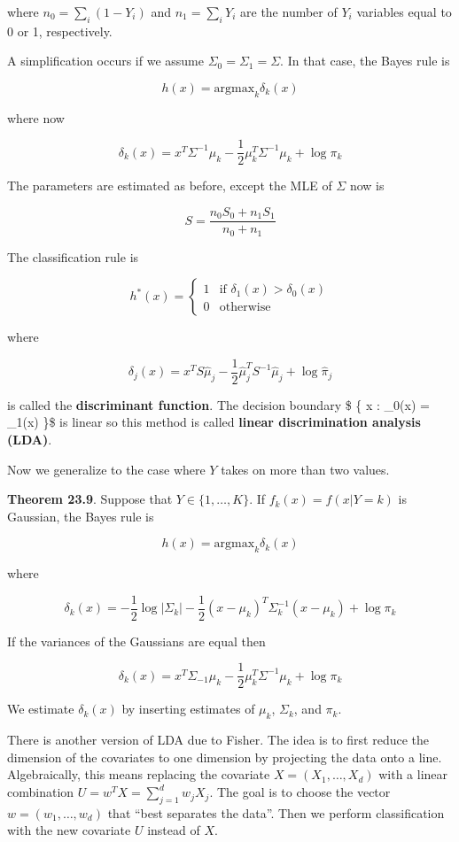 where \(n_0 = \sum_i (1 - Y_i)\) and \(n_1 = \sum_i Y_i\) are the number
of \(Y_i\) variables equal to 0 or 1, respectively.

A simplification occurs if we assume \(\Sigma_0 = \Sigma_1 = \Sigma\).
In that case, the Bayes rule is

\[ h(x) = \text{argmax}_k \delta_k(x) \]

where now

\[ \delta_k(x) = x^T \Sigma^{-1} \mu_k - \frac{1}{2} \mu_k^T \Sigma^{-1} \mu_k + \log \pi_k \]

The parameters are estimated as before, except the MLE of \(\Sigma\) now
is

\[ S = \frac{n_0 S_0 + n_1 S_1}{n_0 + n_1} \]

The classification rule is

\[
h^*(x) = \begin{cases}
1 &\text{if } \delta_1(x) > \delta_0(x) \\
0 &\text{otherwise}
\end{cases}
\]

where

\[ \delta_j(x) = x^T S \hat{\mu}_j - \frac{1}{2} \hat{\mu}_j^T S^{-1} \hat{\mu}_j + \log \hat{\pi}_j \]

is called the \textbf{discriminant function}. The decision boundary \$
\{ x : \delta\_0(x) = \delta\_1(x) \}\$ is linear so this method is
called \textbf{linear discrimination analysis (LDA)}.

Now we generalize to the case where \(Y\) takes on more than two values.

\textbf{Theorem 23.9}. Suppose that \(Y \in \{ 1, \dots, K \}\). If
\(f_k(x) = f(x | Y = k)\) is Gaussian, the Bayes rule is

\[ h(x) = \text{argmax}_k \delta_k(x) \]

where

\[ \delta_k(x) = -\frac{1}{2} \log | \Sigma_k | - \frac{1}{2} (x - \mu_k)^T \Sigma_k^{-1} (x - \mu_k) + \log \pi_k \]

If the variances of the Gaussians are equal then

\[ \delta_k(x) = x^T \Sigma_{-1} \mu_k - \frac{1}{2} \mu_k^T \Sigma^{-1} \mu_k + \log \pi_k \]

We estimate \(\delta_k(x)\) by inserting estimates of \(\mu_k\),
\(\Sigma_k\), and \(\pi_k\).

There is another version of LDA due to Fisher. The idea is to first
reduce the dimension of the covariates to one dimension by projecting
the data onto a line. Algebraically, this means replacing the covariate
\(X = (X_1, \dots, X_d)\) with a linear combination
\(U = w^T X = \sum_{j=1}^d w_j X_j\). The goal is to choose the vector
\(w = (w_1, \dots, w_d)\) that ``best separates the data''. Then we
perform classification with the new covariate \(U\) instead of \(X\).

